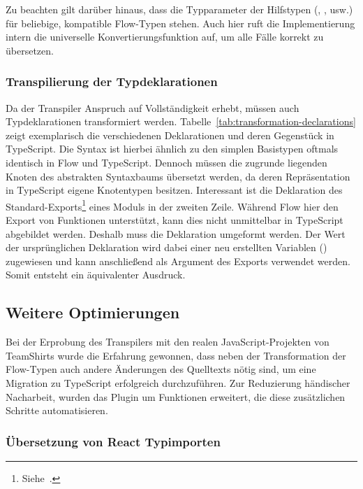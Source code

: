 {\bigbreak


Zu beachten gilt darüber hinaus, dass die Typparameter der Hilfstypen (, ,  usw.) für beliebige, kompatible Flow-Typen stehen. Auch hier ruft die Implementierung intern die universelle Konvertierungsfunktion  auf, um alle Fälle korrekt zu übersetzen.

\subsubsection{Transpilierung der Typdeklarationen}

Da der Transpiler Anspruch auf Vollständigkeit erhebt, müssen auch Typdeklarationen transformiert werden. Tabelle~\ref{tab:transformation-declarations} zeigt exemplarisch die verschiedenen Deklarationen und deren Gegenstück in TypeScript. Die Syntax ist hierbei ähnlich zu den simplen Basistypen oftmals identisch in Flow und TypeScript. Dennoch müssen die zugrunde liegenden Knoten des abstrakten Syntaxbaums übersetzt werden, da deren Repräsentation in TypeScript eigene Knotentypen besitzen. Interessant ist die Deklaration des Standard-Exports\footnote{Siehe~\autocite[377]{ECMASCRIPT:2019}.} eines Moduls in der zweiten Zeile. Während Flow hier den Export von Funktionen unterstützt, kann dies nicht unmittelbar in TypeScript abgebildet werden. Deshalb muss die Deklaration umgeformt werden. Der Wert der ursprünglichen Deklaration wird dabei einer neu erstellten Variablen () zugewiesen und kann anschließend als Argument des Exports verwendet werden. Somit entsteht ein äquivalenter Ausdruck.

\bigbreak


\subsection{Weitere Optimierungen}
\label{subsec:optimizations}

Bei der Erprobung des Transpilers mit den realen JavaScript-Projekten von TeamShirts wurde die Erfahrung gewonnen, dass neben der Transformation der Flow-Typen auch andere Änderungen des Quelltexts nötig sind, um eine Migration zu TypeScript erfolgreich durchzuführen. Zur Reduzierung händischer Nacharbeit, wurden das Plugin um Funktionen erweitert, die diese zusätzlichen Schritte automatisieren.

\subsubsection{Übersetzung von React Typimporten}
\label{subsec:react-type-import-mapping}

}
